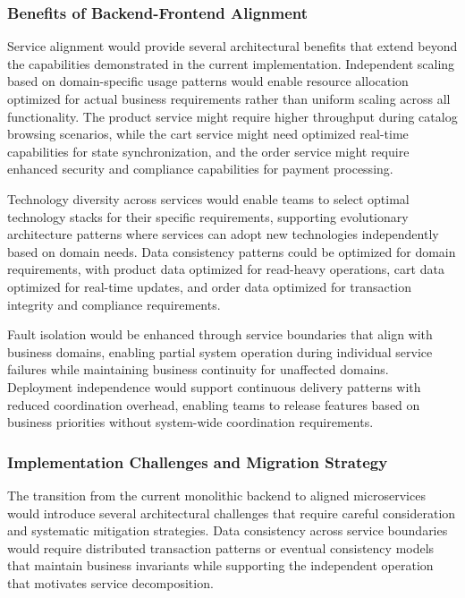 \documentclass[12pt,a4paper]{report}
\begin{document}
\subsubsection{Benefits of Backend-Frontend Alignment}

Service alignment would provide several architectural benefits that extend beyond the capabilities demonstrated in the current implementation. Independent scaling based on domain-specific usage patterns would enable resource allocation optimized for actual business requirements rather than uniform scaling across all functionality. The product service might require higher throughput during catalog browsing scenarios, while the cart service might need optimized real-time capabilities for state synchronization, and the order service might require enhanced security and compliance capabilities for payment processing.

Technology diversity across services would enable teams to select optimal technology stacks for their specific requirements, supporting evolutionary architecture patterns where services can adopt new technologies independently based on domain needs. Data consistency patterns could be optimized for domain requirements, with product data optimized for read-heavy operations, cart data optimized for real-time updates, and order data optimized for transaction integrity and compliance requirements.

Fault isolation would be enhanced through service boundaries that align with business domains, enabling partial system operation during individual service failures while maintaining business continuity for unaffected domains. Deployment independence would support continuous delivery patterns with reduced coordination overhead, enabling teams to release features based on business priorities without system-wide coordination requirements.

\subsubsection{Implementation Challenges and Migration Strategy}

The transition from the current monolithic backend to aligned microservices would introduce several architectural challenges that require careful consideration and systematic mitigation strategies. Data consistency across service boundaries would require distributed transaction patterns or eventual consistency models that maintain business invariants while supporting the independent operation that motivates service decomposition.
\end{document}
